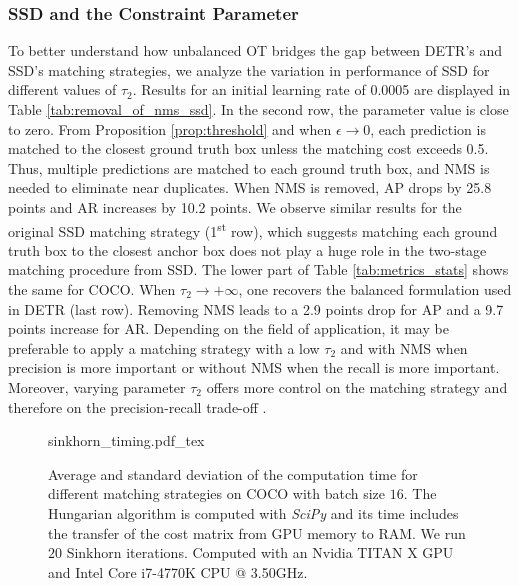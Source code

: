 \subsubsection{SSD and the Constraint Parameter} 
To better understand how unbalanced OT bridges the gap between DETR's and SSD's matching strategies, we analyze the variation in performance of SSD for different values of $\tau_2$. %
Results for an initial learning rate of 0.0005 are displayed in Table \ref{tab:removal_of_nms_ssd}. 
%
In the second row, the parameter value is close to zero. From Proposition \ref{prop:threshold} and when $\epsilon \to 0$, each prediction is matched to the closest ground truth box unless the matching cost exceeds 0.5. Thus, multiple predictions are matched to each ground truth box, and NMS is needed to eliminate near duplicates. When NMS is removed, AP drops by 25.8 points and AR increases by 10.2 points. 
We observe similar results for the original SSD matching strategy (1\textsuperscript{st} row), which suggests matching each ground truth box to the closest anchor box does not play a huge role in the two-stage matching procedure from SSD. The lower part of Table \ref{tab:metrics_stats} shows the same for COCO. When $\tau_2 \to +\infty$, one recovers the balanced formulation used in DETR (last row). Removing NMS leads to a 2.9 points drop for AP and a 9.7 points increase for AR. Depending on the field of application, it may be preferable to apply a matching strategy with a low $\tau_2$ and with NMS when precision is more important or without NMS when the recall is more important. Moreover, varying parameter $\tau_2$ offers more control on the matching strategy and therefore on the precision-recall trade-off \cite{buckland1994precisionrecall}.

\begin{figure}
    \centering
    \def\svgwidth{.8\textwidth}\footnotesize
    \graphicspath{{chapters/uotod/image/}}
    {sinkhorn_timing.pdf_tex}
    \vspace{-0.8em}
    \caption{Average and standard deviation of the computation time for different matching strategies on COCO with batch size $16$. The Hungarian algorithm is computed with \textit{SciPy} and its time includes the transfer of the cost matrix from GPU memory to RAM. We run $20$ Sinkhorn iterations. Computed with an Nvidia TITAN X GPU and Intel Core i7-4770K CPU @ 3.50GHz.}
    \label{fig:avg_matching_time}
\end{figure}

